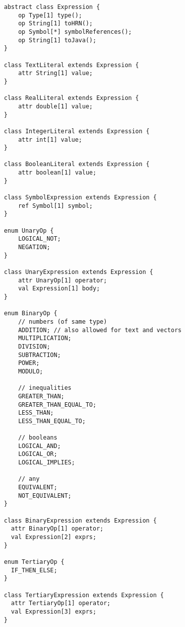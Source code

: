 \documentclass[11pt,fleqn]{article}
\begin{document}
\begin{lstlisting}[caption={Expression Language},label={lst:expression-language}]
abstract class Expression {
	op Type[1] type();
	op String[1] toHRN();
	op Symbol[*] symbolReferences();
	op String[1] toJava();
}

class TextLiteral extends Expression {
	attr String[1] value;
}

class RealLiteral extends Expression {
	attr double[1] value;
}

class IntegerLiteral extends Expression {
	attr int[1] value;
}

class BooleanLiteral extends Expression {
	attr boolean[1] value;
}

class SymbolExpression extends Expression {
    ref Symbol[1] symbol;
}

enum UnaryOp {
	LOGICAL_NOT;
	NEGATION;
}

class UnaryExpression extends Expression {
	attr UnaryOp[1] operator;
	val Expression[1] body;
}

enum BinaryOp {
	// numbers (of same type)
	ADDITION; // also allowed for text and vectors
	MULTIPLICATION;
	DIVISION;
	SUBTRACTION;
	POWER;
	MODULO;

	// inequalities
	GREATER_THAN;
	GREATER_THAN_EQUAL_TO;
	LESS_THAN;
	LESS_THAN_EQUAL_TO;
	
	// booleans
	LOGICAL_AND;
	LOGICAL_OR;
	LOGICAL_IMPLIES;
	
	// any
	EQUIVALENT;
	NOT_EQUIVALENT;
}

class BinaryExpression extends Expression {
  attr BinaryOp[1] operator;
  val Expression[2] exprs;
}

enum TertiaryOp {
  IF_THEN_ELSE;
}

class TertiaryExpression extends Expression {
  attr TertiaryOp[1] operator;
  val Expression[3] exprs;
}
\end{lstlisting}
\end{document}
